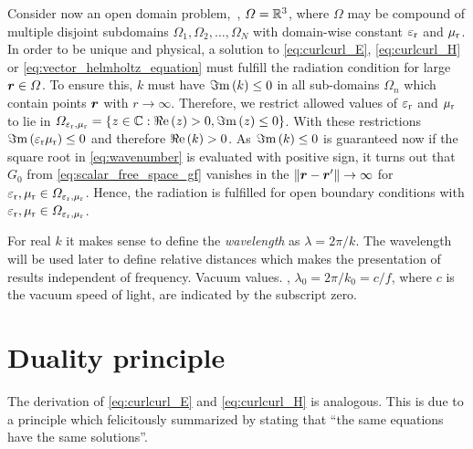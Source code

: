Consider now an open domain problem,~\ie, $\Omega = \mathbb{R}^3$, where $\Omega$ may
be compound of multiple disjoint subdomains
$\Omega_1, \Omega_2, \dots, \Omega_N$ with domain-wise constant $\varepsilon_{\mathrm{r}}$ and
$\mu_{\mathrm{r}}$.
In order to be unique and physical, a solution to \eqref{eq:curlcurl_E},
\eqref{eq:curlcurl_H} or \eqref{eq:vector_helmholtz_equation} must fulfill
the radiation condition for large $\robs \in \Omega$.
To ensure this, $k$ must have $\Im\mathrm{m}\left(k\right) \leq 0$ in all sub-domains $\Omega_n$
which contain points $\robs$ with $r \to \infty$.
Therefore, we restrict allowed values of $\varepsilon_{\mathrm{r}}$ and $\mu_{\mathrm{r}}$ to lie in
$\Omega_{\varepsilon_{\mathrm{r}},\mu_{\mathrm{r}}} = \left\{z \in \mathbb{C} : \Re\mathrm{e}\left(z\right) > 0, \Im\mathrm{m}\left(z\right) \leq 0\right\}$.
With these restrictions $\Im\mathrm{m}\left(\varepsilon_{\mathrm{r}} \mu_{\mathrm{r}}\right) \leq 0$ and therefore $\Re\mathrm{e}\left(k\right) > 0$.
As $\Im\mathrm{m}\left(k\right) \leq 0$ is guaranteed now if the square root in
\eqref{eq:wavenumber} is evaluated with positive sign, it turns out that
$G_0$ from \eqref{eq:scalar_free_space_gf} vanishes in the
$\rdiffNorm \to \infty$ for $\varepsilon_{\mathrm{r}}, \mu_{\mathrm{r}} \in \Omega_{\varepsilon_{\mathrm{r}},\mu_{\mathrm{r}}}$.
Hence, the radiation is fulfilled for open boundary conditions with
$\varepsilon_{\mathrm{r}}, \mu_{\mathrm{r}} \in \Omega_{\varepsilon_{\mathrm{r}},\mu_{\mathrm{r}}}$.

For real $k$ it makes sense to define the \emph{wavelength} as
$\lambda = 2\pi / k$.
The wavelength will be used later to define relative distances which makes
the presentation of results independent of frequency.
Vacuum values. \eg, $\lambda_0 = 2\pi / k_0 = c / f$,
where $c$ is the vacuum speed of light, are indicated by the subscript zero.









\section{Duality principle}
\label{sec:duality_principle}

The derivation of \eqref{eq:curlcurl_E} and \eqref{eq:curlcurl_H} is analogous.
This is due to a principle which \textcite[\S12-1]{Feynman2011} felicitously
summarized by stating that \enquote{the same equations have the same solutions}.

